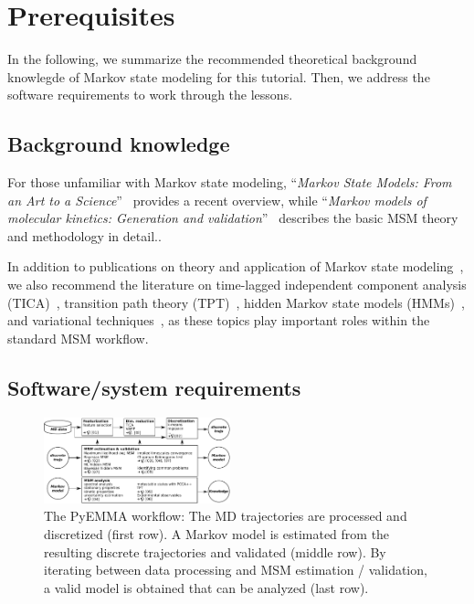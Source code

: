 \documentclass[9pt,tutorial]{livecoms}
\begin{document}
\section{Prerequisites}

In the following, we summarize the recommended theoretical background knowlegde of Markov state modeling for this tutorial.
Then, we address the software requirements to work through the lessons.

\subsection{Background knowledge}
\label{sec:background}

For those unfamiliar with Markov state modeling, ``\emph{Markov State Models: From an Art to a Science}''~\cite{msm-brooke} provides a recent overview, while ``\emph{Markov models of molecular kinetics: Generation and validation}''~\cite{msm-jhp} describes the basic MSM theory and methodology in detail.. 

In addition to publications on theory and application of Markov state modeling~\cite{msm-book,buchete-msm-2008,noe-tmat-sampling,bowman-msm-2009,noe-folding-pathways,sarich-msm-quality,noe-fingerprints,noe-dy-neut-scatt,Chodera2014,ben-rev-msm,simon-mech-mod-nmr,oom-feliks},
we also recommend the literature on time-lagged independent component analysis (TICA)~\cite{tica,tica3,tica2,kinetic-maps}, transition path theory (TPT)~\cite{weinan-tpt,metzner-msm-tpt},
hidden Markov state models (HMMs)~\cite{noe-proj-hid-msm,hmm-baum-welch-alg,hmm-tutorial}, and variational techniques~\cite{noe-vac,vamp-preprint,gmrq}, as these topics play important roles within the standard MSM workflow.

\subsection{Software/system requirements}

\begin{figure}
\includegraphics[width=0.48\textwidth]{figure_1}
\caption{The PyEMMA workflow: The MD trajectories are processed and discretized (first row). A Markov model is estimated from the resulting discrete trajectories and validated (middle row). By iterating between data processing and MSM estimation / validation, a valid model is obtained that can be analyzed (last row).}
\label{fig:workflowchart}
\end{figure}
\end{document}
